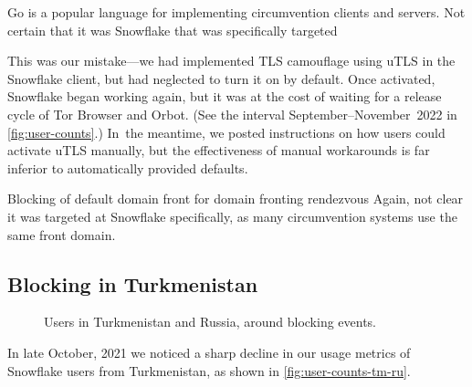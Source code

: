 \documentclass[letterpaper,twocolumn]{article}
\begin{document}
Go is a popular language for implementing circumvention clients and servers.
Not certain that it was Snowflake that was specifically targeted

This was our mistake---we had implemented TLS camouflage using uTLS
in the Snowflake client, but had neglected to turn it on by default.
Once activated, Snowflake began working again,
but it was at the cost of waiting for a release cycle of Tor Browser and Orbot.
(See the interval September--November~2022 in \autoref{fig:user-counts}.)
In~the meantime, we posted instructions on how users could activate uTLS manually,
but the effectiveness of manual workarounds is far inferior to automatically provided defaults.

Blocking of default domain front for domain fronting rendezvous
Again, not clear it was targeted at Snowflake specifically,
as many circumvention systems use the same front domain.

\subsection{Blocking in Turkmenistan}
\label{sec:block-tm}

\begin{figure}
\caption{
Users in Turkmenistan and Russia,
around blocking events.
}
\label{fig:user-counts-tm-ru}
\end{figure}



In late October, 2021 we noticed a sharp decline in our usage metrics of Snowflake users from 
Turkmenistan, as shown in \autoref{fig:user-counts-tm-ru}.
\end{document}
